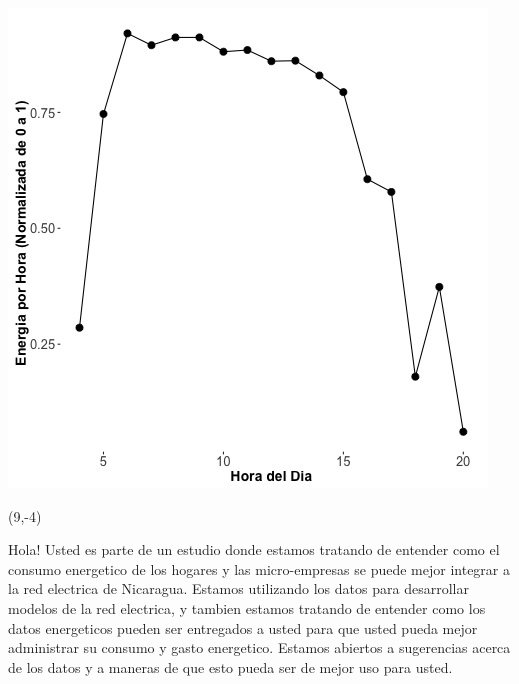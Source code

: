 \documentclass{article}\usepackage[]{graphicx}\usepackage[]{color}
\newenvironment{knitrout}{}{} %
\begin{document}
\begin{knitrout}
\color{fgcolor}
\includegraphics[scale=0.75]{figure/A16_fplot_norm_median} 
\end{knitrout}

 \begin{textblock}{1}(9,-4)
\begin{minipage}{20em}
\begingroup

\endgroup
\end{minipage}
\end{textblock}

\vspace{70px}
\begin{knitrout}
Hola! Usted es parte de un estudio donde estamos tratando de entender como el consumo energetico de los hogares y las micro-empresas se puede mejor integrar a la red electrica de Nicaragua. Estamos utilizando los datos para desarrollar modelos de la red electrica, y tambien estamos tratando de entender como los datos energeticos pueden ser entregados a usted para que usted pueda mejor administrar su consumo y gasto energetico.  Estamos abiertos a sugerencias acerca de los datos y a maneras de que esto pueda ser de mejor uso para usted.
\end{knitrout}
\end{document}

